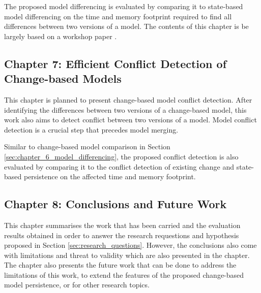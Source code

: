The proposed model differencing is evaluated by comparing it to state-based model differencing on the time and memory footprint required to find all differences between two versions of a model. The contents of this chapter is be largely based on a workshop paper \cite{yohannis2018efficient}.

\subsection{Chapter 7: Efficient Conflict Detection of Change-based Models}
\label{sec:chapter_7_conflict_detection}
This chapter is planned to present change-based model conflict detection. After identifying the differences between two versions of a change-based model, this work also aims to detect conflict between two versions of a model. Model conflict detection is a crucial step that precedes model merging.

Similar to change-based model comparison in Section \ref{sec:chapter_6_model_differencing}, the proposed conflict detection is also evaluated by comparing it to the conflict detection of existing change and state-based persistence on the affected time and memory footprint.

\subsection{Chapter 8: Conclusions and Future Work}
\label{sec:chapter_8_conclusions_and_future_work}
This chapter summarises the work that has been carried and the evaluation results obtained in order to answer the research requestions and hypothesis proposed in Section \ref{sec:research_questions}. However, the conclusions also come with limitations and threat to validity which are also presented in the chapter. The chapter also presents the future work that can be done to address the limitations of this work, to extend the features of the proposed change-based model persistence, or for other research topics.

